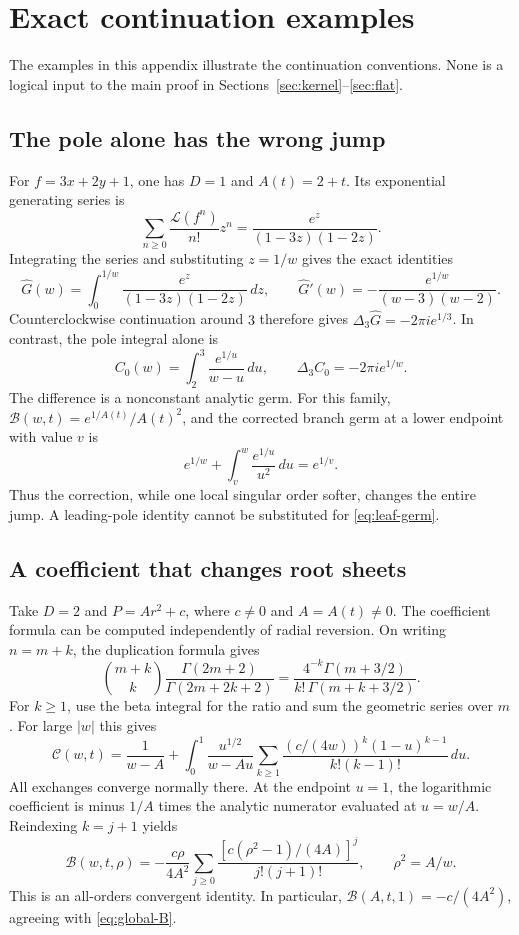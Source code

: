 \documentclass[11pt]{article}
\numberwithin{equation}{section}
\theoremstyle{definition}\newtheorem{definition}[theorem]{Definition}
\theoremstyle{remark}\newtheorem{remark}[theorem]{Remark}
\newcommand{\Lfac}{\mathcal L}
\newcommand{\CC}{\mathcal C}
\newcommand{\HH}{\widehat G}
\newcommand{\dd}{\,d}
\begin{document}
\appendix

\section{Exact continuation examples}\label{app:examples}
The examples in this appendix illustrate the continuation conventions.
None is a logical input to the main proof in
Sections~\ref{sec:kernel}--\ref{sec:flat}.

\subsection{The pole alone has the wrong jump}
For $f=3x+2y+1$, one has $D=1$ and $A(t)=2+t$. Its exponential
generating series is
\[
 \sum_{n\ge0}\frac{\Lfac(f^n)}{n!}z^n
       =\frac{e^z}{(1-3z)(1-2z)}.
\]
Integrating the series and substituting $z=1/w$ gives the exact identities
\[
 \HH(w)=\int_0^{1/w}\frac{e^z}{(1-3z)(1-2z)}\dd z,
 \qquad \HH'(w)=-\frac{e^{1/w}}{(w-3)(w-2)}.
\]
Counterclockwise continuation around $3$ therefore gives
$\Delta_3\HH=-2\pi i e^{1/3}$. In contrast, the pole integral alone is
\[
 C_0(w)=\int_2^3\frac{e^{1/u}}{w-u}\dd u,
 \qquad \Delta_3 C_0=-2\pi i e^{1/w}.
\]
The difference is a nonconstant analytic germ. For this family,
$\mathscr B(w,t)=e^{1/A(t)}/A(t)^2$, and the corrected branch germ
at a lower endpoint with value $v$ is
\[
 e^{1/w}+\int_v^w\frac{e^{1/u}}{u^2}\dd u=e^{1/v}.
\]
Thus the correction, while one local singular order softer, changes the
entire jump. A leading-pole identity cannot be substituted for
\eqref{eq:leaf-germ}.

\subsection{A coefficient that changes root sheets}
Take $D=2$ and $P=Ar^2+c$, where $c\ne0$ and $A=A(t)\ne0$.
The coefficient formula can be computed independently of radial
reversion. On writing $n=m+k$, the duplication formula gives
\[
 \binom{m+k}{k}\frac{\Gamma(2m+2)}{\Gamma(2m+2k+2)}
 =\frac{4^{-k}\Gamma(m+3/2)}{k!\,\Gamma(m+k+3/2)}.
\]
For $k\ge1$, use the beta integral for the ratio and sum the geometric
series over $m$. For large $|w|$ this gives
\begin{equation}\label{eq:quadratic-beta}
 \CC(w,t)=\frac1{w-A}
 +\int_0^1\frac{u^{1/2}}{w-Au}
       \sum_{k\ge1}\frac{(c/(4w))^k(1-u)^{k-1}}{k!(k-1)!}\dd u.
\end{equation}
All exchanges converge normally there. At the endpoint $u=1$, the
logarithmic coefficient is minus $1/A$ times the analytic numerator
evaluated at $u=w/A$. Reindexing $k=j+1$ yields
\begin{equation}\label{eq:quadratic-B}
 \mathscr B(w,t,\rho)
 =-\frac{c\rho}{4A^2}
   \sum_{j\ge0}\frac{[c(\rho^2-1)/(4A)]^j}{j!(j+1)!},
 \qquad \rho^2=A/w.
\end{equation}
This is an all-orders convergent identity. In particular,
$\mathscr B(A,t,1)=-c/(4A^2)$, agreeing with
\eqref{eq:global-B}.
\end{document}
